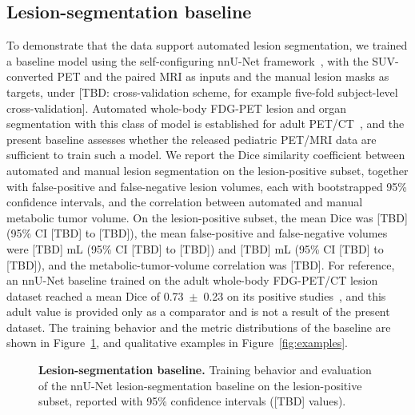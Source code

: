 \subsection*{Lesion-segmentation baseline}\label{subsec:baseline}
To demonstrate that the data support automated lesion segmentation, we trained a baseline model using the self-configuring nnU-Net framework~\cite{Isensee_2021}, with the SUV-converted PET and the paired MRI as inputs and the manual lesion masks as targets, under [TBD: cross-validation scheme, for example five-fold subject-level cross-validation].
Automated whole-body FDG-PET lesion and organ segmentation with this class of model is established for adult PET/CT~\cite{Gatidis_2024,Sundar_2022}, and the present baseline assesses whether the released pediatric PET/MRI data are sufficient to train such a model.
We report the Dice similarity coefficient between automated and manual lesion segmentation on the lesion-positive subset, together with false-positive and false-negative lesion volumes, each with bootstrapped 95\% confidence intervals, and the correlation between automated and manual metabolic tumor volume.
On the lesion-positive subset, the mean Dice was [TBD] (95\% CI [TBD] to [TBD]), the mean false-positive and false-negative volumes were [TBD] mL (95\% CI [TBD] to [TBD]) and [TBD] mL (95\% CI [TBD] to [TBD]), and the metabolic-tumor-volume correlation was [TBD].
For reference, an nnU-Net baseline trained on the adult whole-body FDG-PET/CT lesion dataset reached a mean Dice of 0.73~$\pm$~0.23 on its positive studies~\cite{Gatidis_2022}, and this adult value is provided only as a comparator and is not a result of the present dataset.
The training behavior and the metric distributions of the baseline are shown in Figure~\ref{fig:baseline}, and qualitative examples in Figure~\ref{fig:examples}.

\begin{figure}[t]
\centering
{}
\caption{\textbf{Lesion-segmentation baseline.}
Training behavior and evaluation of the nnU-Net lesion-segmentation baseline on the lesion-positive subset, reported with 95\% confidence intervals ([TBD] values).}
\label{fig:baseline}
\end{figure}

